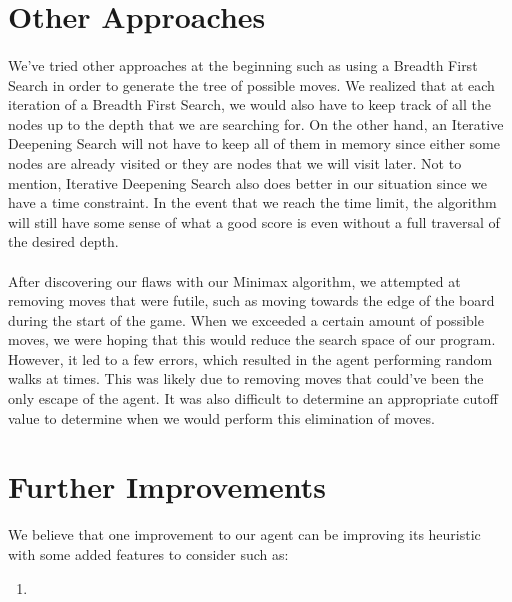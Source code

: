 \documentclass[12pt,a4paper]{article}
\begin{document}
\section{Other Approaches}
\paragraph{} We've tried other approaches at the beginning such as using a Breadth First Search in order to generate the 
tree of possible moves. We realized that at each iteration of a Breadth First Search, 
we would also have to keep track of 
all the nodes up to the depth that we are searching for. On the other hand, an Iterative Deepening Search will not 
have to keep all of them in memory since either some nodes are already visited or they are nodes that we will 
visit later. Not to mention, Iterative Deepening Search also does better in our situation since we have a time 
constraint. In the event that we reach the time limit, the algorithm will still 
have some sense of what a good score is even without 
a full traversal of the desired depth. 
\paragraph{} After discovering our flaws with our Minimax algorithm, we attempted at removing moves that were futile, 
such as moving towards the edge of the board during the start of the game. 
When we exceeded a certain amount of possible moves, we were hoping that this would reduce the 
search space of our program. However, it led to a few errors, which resulted in the agent performing random walks at 
times. 
This was likely due to removing moves that could've been the only escape of the agent. It was also difficult to 
determine an appropriate cutoff value to determine when we would perform this elimination 
of moves. 


\section{Further Improvements}
We believe that one improvement to our agent can be improving its heuristic with some added features to consider 
such as: 
\begin{enumerate}
    \item 
\end{enumerate}
\end{document}
